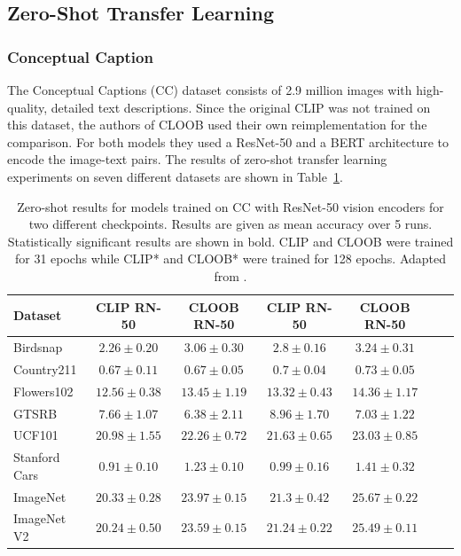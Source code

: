 \documentclass{scrarticle}
\begin{document}
\subsection{Zero-Shot Transfer Learning}

\subsubsection{Conceptual Caption}

The Conceptual Captions (CC) dataset \cite{cc} consists of 2.9 million images with high-quality, detailed text descriptions. Since the original CLIP was not trained on this dataset, the authors of CLOOB used their own reimplementation for the comparison. For both models they used a ResNet-50 and a BERT architecture to encode the image-text pairs. The results of zero-shot transfer learning experiments on seven different datasets are shown in Table~\ref{table:cc}.

\begin{table}[H]
    \begin{center}
        \begin{tabular}{l | c c | c c | c c }
Dataset       &CLIP RN-50     &CLOOB RN-50                &CLIP RN-50               &CLOOB RN-50    \\
\hline
Birdsnap      &$2.26\pm0.20$  &$\mathbf{3.06\pm0.30}$     &$2.8\pm0.16$     &$\mathbf{3.24\pm0.31}$ \\
Country211    &$0.67\pm0.11$  &$0.67\pm0.05$              &$0.7\pm0.04$     &$0.73\pm0.05$          \\
Flowers102    &$12.56\pm0.38$ &$13.45\pm1.19$             &$13.32\pm0.43$   &$14.36\pm1.17$         \\
GTSRB         &$7.66\pm1.07$  &$6.38\pm2.11$              &$8.96\pm1.70$    &$7.03\pm1.22$          \\
UCF101        &$20.98\pm1.55$ &$22.26\pm0.72$             &$21.63\pm0.65$   &$\mathbf{23.03\pm0.85}$\\
Stanford Cars &$0.91\pm0.10$  &$\mathbf{1.23\pm0.10}$     &$0.99\pm0.16$    &$\mathbf{1.41\pm0.32}$ \\
ImageNet      &$20.33\pm0.28$ &$\mathbf{23.97\pm0.15}$    &$21.3\pm0.42$    &$\mathbf{25.67\pm0.22}$\\
ImageNet V2   &$20.24\pm0.50$ &$\mathbf{23.59\pm0.15}$    &$21.24\pm0.22$   &$\mathbf{25.49\pm0.11}$\\
        \end{tabular}
    \end{center}
    \caption{Zero-shot results for models trained on CC with ResNet-50 vision encoders for two different checkpoints. Results are given as mean accuracy over 5 runs. Statistically significant results are shown in bold. CLIP and CLOOB were trained for 31 epochs while CLIP* and CLOOB* were trained for 128 epochs. Adapted from \citet{cloob}.}
    \label{table:cc}
\end{table}
\end{document}
